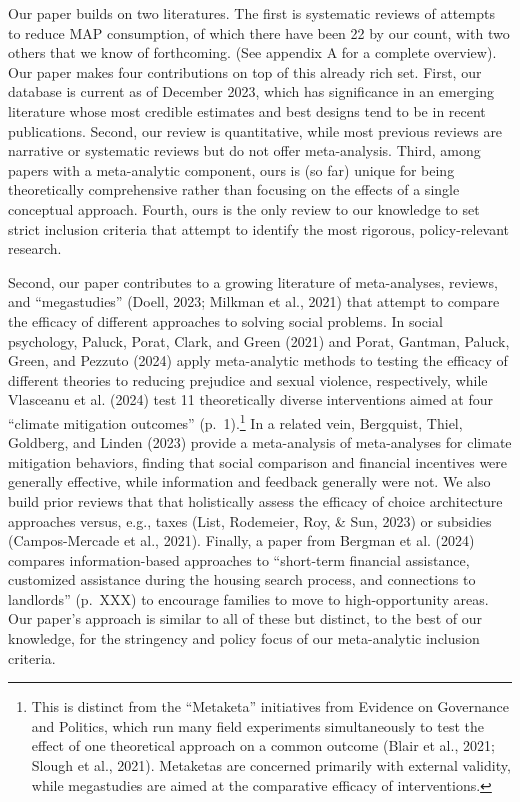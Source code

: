 \documentclass[
  man]{apa6}
\begin{document}
Our paper builds on two literatures. The first is systematic reviews of attempts to reduce MAP consumption, of which there have been 22 by our count, with two others that we know of forthcoming. (See appendix A for a complete overview). Our paper makes four contributions on top of this already rich set. First, our database is current as of December 2023, which has significance in an emerging literature whose most credible estimates and best designs tend to be in recent publications. Second, our review is quantitative, while most previous reviews are narrative or systematic reviews but do not offer meta-analysis. Third, among papers with a meta-analytic component, ours is (so far) unique for being theoretically comprehensive rather than focusing on the effects of a single conceptual approach. Fourth, ours is the only review to our knowledge to set strict inclusion criteria that attempt to identify the most rigorous, policy-relevant research.

Second, our paper contributes to a growing literature of meta-analyses, reviews, and ``megastudies'' (Doell, 2023; Milkman et al., 2021) that attempt to compare the efficacy of different approaches to solving social problems. In social psychology, Paluck, Porat, Clark, and Green (2021) and Porat, Gantman, Paluck, Green, and Pezzuto (2024) apply meta-analytic methods to testing the efficacy of different theories to reducing prejudice and sexual violence, respectively, while Vlasceanu et al. (2024) test 11 theoretically diverse interventions aimed at four ``climate mitigation outcomes'' (p.~1).\footnote{This is distinct from the ``Metaketa'' initiatives from Evidence on Governance and Politics, which run many field experiments simultaneously to test the effect of one theoretical approach on a common outcome (Blair et al., 2021; Slough et al., 2021). Metaketas are concerned primarily with external validity, while megastudies are aimed at the comparative efficacy of interventions.} In a related vein, Bergquist, Thiel, Goldberg, and Linden (2023) provide a meta-analysis of meta-analyses for climate mitigation behaviors, finding that social comparison and financial incentives were generally effective, while information and feedback generally were not. We also build prior reviews that that holistically assess the efficacy of choice architecture approaches versus, e.g., taxes (List, Rodemeier, Roy, \& Sun, 2023) or subsidies (Campos-Mercade et al., 2021). Finally, a paper from Bergman et al. (2024) compares information-based approaches to ``short-term financial assistance, customized assistance during the housing search process, and connections to landlords'' (p.~XXX) to encourage families to move to high-opportunity areas. Our paper's approach is similar to all of these but distinct, to the best of our knowledge, for the stringency and policy focus of our meta-analytic inclusion criteria.
\end{document}
